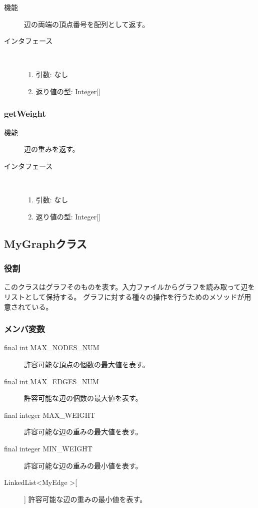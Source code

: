 \documentclass[a4j]{jarticle}
\begin{document}
\begin{description}
\item[機能]
辺の両端の頂点番号を配列として返す。

\item[インタフェース]\ \vspace{0mm}
\begin{enumerate}
  \item 引数: なし
  \item 返り値の型: Integer[]
\end{enumerate}
\end{description}

\subsubsection{getWeight}

\begin{description}
\item[機能]
辺の重みを返す。

\item[インタフェース]\ \vspace{0mm}
\begin{enumerate}
  \item 引数: なし
  \item 返り値の型: Integer[]
\end{enumerate}
\end{description}

\subsection{MyGraphクラス}

\subsubsection{役割}
このクラスはグラフそのものを表す。入力ファイルからグラフを読み取って辺をリストとして保持する。
グラフに対する種々の操作を行うためのメソッドが用意されている。

\subsubsection{メンバ変数}

\begin{description}
\item[final int MAX\_NODES\_NUM]
許容可能な頂点の個数の最大値を表す。

\item[final int MAX\_EDGES\_NUM]
許容可能な辺の個数の最大値を表す。

\item[final integer MAX\_WEIGHT]
許容可能な辺の重みの最大値を表す。

\item[final integer MIN\_WEIGHT]
許容可能な辺の重みの最小値を表す。

\item[LinkedList\textless MyEdge \textgreater[] ]
許容可能な辺の重みの最小値を表す。

\end{description}
\end{document}
